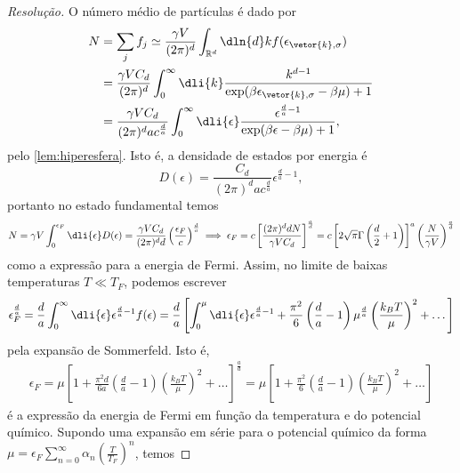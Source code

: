 \begin{proof}[Resolução]
    O número médio de partículas é dado por
    \begin{align*}
        N &= \sum_{j} f_j \simeq \frac{\gamma V}{(2\pi)^d}\int_{\mathbb{R}^d} \dln{d}k f(\epsilon_{\vetor{k}, \sigma})\\
          &= \frac{\gamma V C_d}{(2\pi)^d} \int_0^\infty \dli{k} \frac{k^{d - 1}}{\exp(\beta \epsilon_{\vetor{k},\sigma} - \beta \mu) + 1}\\
          &= \frac{\gamma V C_d}{(2\pi)^d ac^\frac{d}{a}} \int_0^\infty \dli{\epsilon}\frac{\epsilon^{\frac{d}{a} - 1}}{\exp(\beta \epsilon - \beta \mu) + 1},
    \end{align*}
    pelo \cref{lem:hiperesfera}. Isto é, a densidade de estados por energia é
    \begin{equation*}
        D(\epsilon) = \frac{C_d}{(2\pi)^d ac^{\frac{d}{a}}} \epsilon^{\frac{d}{a} - 1},
    \end{equation*}
    portanto no estado fundamental temos
    \begin{equation*}
        N = \gamma V \int_0^{\epsilon_F} \dli{\epsilon} D(\epsilon) = \frac{\gamma V C_d}{(2\pi)^d d } \left(\frac{\epsilon_F}{c}\right)^{\frac{d}{a}} \implies \epsilon_F = c \left[\frac{(2\pi)^{d} d N}{\gamma V C_d}\right]^{\frac{a}{d}} = c\left[2\sqrt{\pi} \Gamma\left(\frac{d}{2}+1\right)\right]^{a} \left(\frac{N}{\gamma V}\right)^{\frac{a}{d}}
    \end{equation*}
    como a expressão para a energia de Fermi. Assim, no limite de baixas temperaturas \(T \ll T_F\), podemos escrever
    \begin{equation*}
        \epsilon_F^{\frac{d}{a}} = \frac{d}{a}\int_0^\infty \dli{\epsilon} \epsilon^{\frac{d}{a} - 1}f(\epsilon) = \frac{d}{a}\left[\int_0^\mu \dli{\epsilon} \epsilon^{\frac{d}{a} - 1} + \frac{\pi^2}{6} \left(\frac{d}{a} - 1\right)\mu^{\frac{d}{a}}\left(\frac{k_B T}{\mu}\right)^2 + \dots\right] %
    \end{equation*}
    pela expansão de Sommerfeld. Isto é,
    \begin{align*}
        \epsilon_F = \mu\left[1 + \frac{\pi^2d}{6a}\left(\frac{d}{a}- 1\right)\left(\frac{k_BT}{\mu}\right)^2+ \dots\right]^{\frac{a}{d}} = \mu\left[1 + \frac{\pi^2}{6}\left(\frac{d}{a} -1\right)\left(\frac{k_B T}{\mu}\right)^2 + \dots\right]
    \end{align*}
    é a expressão da energia de Fermi em função da temperatura e do potencial químico. Supondo uma expansão em série para o potencial químico da forma \(\mu = \epsilon_F\sum_{n = 0}^\infty \alpha_n \left(\frac{T}{T_F}\right)^n\), temos

\end{proof}

